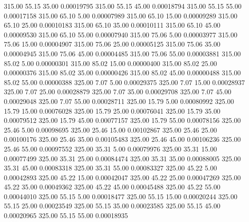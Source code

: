     315.00     55.15     35.00     0.00019795
    315.00     55.15     45.00     0.00018794
    315.00     55.15     55.00     0.00017158
    315.00     65.10      5.00     0.00007989
    315.00     65.10     15.00     0.00009289
    315.00     65.10     25.00     0.00010183
    315.00     65.10     35.00     0.00010111
    315.00     65.10     45.00     0.00009530
    315.00     65.10     55.00     0.00007940
    315.00     75.06      5.00     0.00003977
    315.00     75.06     15.00     0.00004907
    315.00     75.06     25.00     0.00005125
    315.00     75.06     35.00     0.00004945
    315.00     75.06     45.00     0.00004485
    315.00     75.06     55.00     0.00003881
    315.00     85.02      5.00     0.00000301
    315.00     85.02     15.00     0.00000400
    315.00     85.02     25.00     0.00000376
    315.00     85.02     35.00     0.00000426
    315.00     85.02     45.00     0.00000488
    315.00     85.02     55.00     0.00000388
    325.00      7.07      5.00     0.00029375
    325.00      7.07     15.00     0.00028937
    325.00      7.07     25.00     0.00028879
    325.00      7.07     35.00     0.00029708
    325.00      7.07     45.00     0.00029048
    325.00      7.07     55.00     0.00028711
    325.00     15.79      5.00     0.00080992
    325.00     15.79     15.00     0.00076028
    325.00     15.79     25.00     0.00076041
    325.00     15.79     35.00     0.00079512
    325.00     15.79     45.00     0.00077157
    325.00     15.79     55.00     0.00078156
    325.00     25.46      5.00     0.00098695
    325.00     25.46     15.00     0.00102867
    325.00     25.46     25.00     0.00100176
    325.00     25.46     35.00     0.00105483
    325.00     25.46     45.00     0.00106236
    325.00     25.46     55.00     0.00097552
    325.00     35.31      5.00     0.00079976
    325.00     35.31     15.00     0.00077499
    325.00     35.31     25.00     0.00084474
    325.00     35.31     35.00     0.00088005
    325.00     35.31     45.00     0.00083318
    325.00     35.31     55.00     0.00083327
    325.00     45.22      5.00     0.00042893
    325.00     45.22     15.00     0.00042047
    325.00     45.22     25.00     0.00047269
    325.00     45.22     35.00     0.00049362
    325.00     45.22     45.00     0.00045488
    325.00     45.22     55.00     0.00044010
    325.00     55.15      5.00     0.00018477
    325.00     55.15     15.00     0.00020244
    325.00     55.15     25.00     0.00023549
    325.00     55.15     35.00     0.00023585
    325.00     55.15     45.00     0.00020965
    325.00     55.15     55.00     0.00018935
